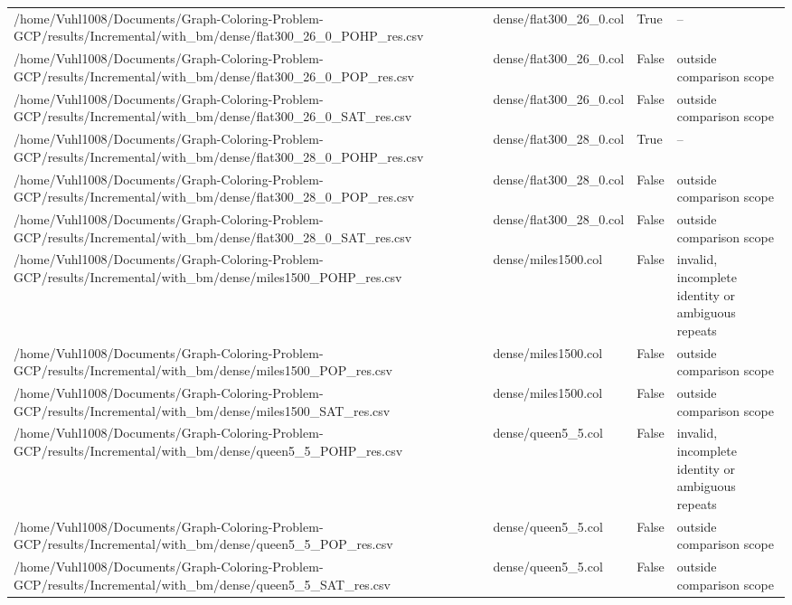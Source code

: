 \begin{table}[htbp]
\begin{tabular}{llll}
/home/Vuhl1008/Documents/Graph-Coloring-Problem-GCP/results/Incremental/with\_bm/dense/flat300\_26\_0\_POHP\_res.csv & dense/flat300\_26\_0.col & True & -- \\
/home/Vuhl1008/Documents/Graph-Coloring-Problem-GCP/results/Incremental/with\_bm/dense/flat300\_26\_0\_POP\_res.csv & dense/flat300\_26\_0.col & False & outside comparison scope \\
/home/Vuhl1008/Documents/Graph-Coloring-Problem-GCP/results/Incremental/with\_bm/dense/flat300\_26\_0\_SAT\_res.csv & dense/flat300\_26\_0.col & False & outside comparison scope \\
/home/Vuhl1008/Documents/Graph-Coloring-Problem-GCP/results/Incremental/with\_bm/dense/flat300\_28\_0\_POHP\_res.csv & dense/flat300\_28\_0.col & True & -- \\
/home/Vuhl1008/Documents/Graph-Coloring-Problem-GCP/results/Incremental/with\_bm/dense/flat300\_28\_0\_POP\_res.csv & dense/flat300\_28\_0.col & False & outside comparison scope \\
/home/Vuhl1008/Documents/Graph-Coloring-Problem-GCP/results/Incremental/with\_bm/dense/flat300\_28\_0\_SAT\_res.csv & dense/flat300\_28\_0.col & False & outside comparison scope \\
/home/Vuhl1008/Documents/Graph-Coloring-Problem-GCP/results/Incremental/with\_bm/dense/miles1500\_POHP\_res.csv & dense/miles1500.col & False & invalid, incomplete identity or ambiguous repeats \\
/home/Vuhl1008/Documents/Graph-Coloring-Problem-GCP/results/Incremental/with\_bm/dense/miles1500\_POP\_res.csv & dense/miles1500.col & False & outside comparison scope \\
/home/Vuhl1008/Documents/Graph-Coloring-Problem-GCP/results/Incremental/with\_bm/dense/miles1500\_SAT\_res.csv & dense/miles1500.col & False & outside comparison scope \\
/home/Vuhl1008/Documents/Graph-Coloring-Problem-GCP/results/Incremental/with\_bm/dense/queen5\_5\_POHP\_res.csv & dense/queen5\_5.col & False & invalid, incomplete identity or ambiguous repeats \\
/home/Vuhl1008/Documents/Graph-Coloring-Problem-GCP/results/Incremental/with\_bm/dense/queen5\_5\_POP\_res.csv & dense/queen5\_5.col & False & outside comparison scope \\
/home/Vuhl1008/Documents/Graph-Coloring-Problem-GCP/results/Incremental/with\_bm/dense/queen5\_5\_SAT\_res.csv & dense/queen5\_5.col & False & outside comparison scope \\

\end{tabular}
\end{table}
